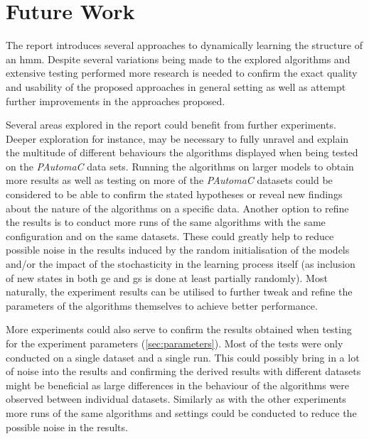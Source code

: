 \chapter{Future Work}
\label{chap:future_work}
The report introduces several approaches to dynamically learning the structure of an \gls{hmm}. Despite several variations being made to the explored algorithms and extensive testing performed more research is needed to confirm the exact quality and usability of the proposed approaches in general setting as well as attempt further improvements in the approaches proposed.

Several areas explored in the report could benefit from further experiments. Deeper exploration for instance, may be necessary to fully unravel and explain the multitude of different behaviours the algorithms displayed when being tested on the \emph{PAutomaC} data sets. Running the algorithms on larger models to obtain more results as well as testing on more of the \emph{PAutomaC} datasets could be considered to be able to confirm the stated hypotheses or reveal new findings about the nature of the algorithms on a specific data. Another option to refine the results is to conduct more runs of the same algorithms with the same configuration and on the same datasets. These could greatly help to reduce possible noise in the results induced by the random initialisation of the models and/or the impact of the stochasticity in the learning process itself (as inclusion of new states in both \acrlong{ge} and \acrlong{gs} is done at least partially randomly).
Most naturally, the experiment results can be utilised to further tweak and refine the parameters of the algorithms themselves to achieve better performance.

More experiments could also serve to confirm the results obtained when testing for the experiment parameters (\ref{sec:parameters}). Most of the tests were only conducted on a single dataset and a single run. This could possibly bring in a lot of noise into the results and confirming the derived results with different datasets might be beneficial as large differences in the behaviour of the algorithms were observed between individual datasets. Similarly as with the other experiments more runs of the same algorithms and settings could be conducted to reduce the possible noise in the results.

